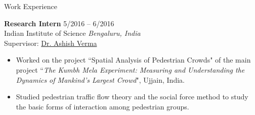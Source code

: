 \documentclass{CV} %
\begin{document}
\begin{rSection}{Work Experience}
\begin{itemize}[noitemsep]
    \end{itemize}
    {\bf Research Intern} \hfill {5/2016 – 6/2016}
    \\ Indian Institute of Science \hfill {\em Bengaluru, India}
    \\ Supervisor: \href{http://civil.iisc.ernet.in/~ashishv/}{Dr. Ashish Verma}
    \begin{itemize}[noitemsep]
        \item Worked on the project ``Spatial Analysis of Pedestrian Crowds" of the main project ``\textit{The Kumbh Mela Experiment: Measuring and Understanding the Dynamics of Mankind’s Largest Crowd}", Ujjain, India.
        \item Studied pedestrian traffic flow theory and the social force method to study the basic forms of interaction among pedestrian groups.
    \end{itemize}
\end{rSection}
\end{document}
